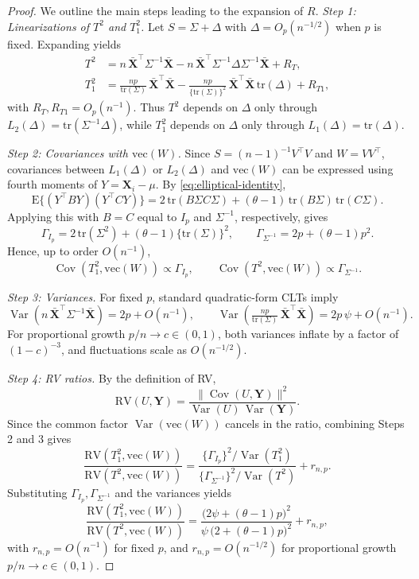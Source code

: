 \documentclass[12pt]{article}
\theoremstyle{remark}
\theoremstyle{plain}
\DeclareMathOperator{\Var}{Var}
\DeclareMathOperator{\Cov}{Cov}
\begin{document}
\begin{proof} We outline the main steps leading to the expansion of $R$.
	\textit{Step 1: Linearizations of $T^2$ and $T_1^2$.}  
	Let $S=\Sigma+\Delta$ with $\Delta=O_p(n^{-1/2})$ when $p$ is fixed. Expanding yields
	\begin{align}
		T^2 &= n\,\bar{\mathbf{X}}^{\top}\Sigma^{-1}\bar{\mathbf{X}}
		- n\,\bar{\mathbf{X}}^{\top}\Sigma^{-1}\Delta\Sigma^{-1}\bar{\mathbf{X}} + R_{T}, \label{eq:T2-exp}\\
		T_1^2 &= \frac{n p}{\mathrm{tr}(\Sigma)}\,\bar{\mathbf{X}}^{\top}\bar{\mathbf{X}}
		- \frac{n p}{\{\mathrm{tr}(\Sigma)\}^{2}}\,\bar{\mathbf{X}}^{\top}\bar{\mathbf{X}}\,\mathrm{tr}(\Delta) + R_{T1}, \label{eq:T1-exp}
	\end{align}
	with $R_T,R_{T1}=O_p(n^{-1})$. Thus $T^2$ depends on $\Delta$ only through $L_2(\Delta)=\mathrm{tr}(\Sigma^{-1}\Delta)$, while $T_1^2$ depends on $\Delta$ only through $L_1(\Delta)=\mathrm{tr}(\Delta)$.
	
	\textit{Step 2: Covariances with $\mathrm{vec}(W)$.}  
	Since $S=(n-1)^{-1}V^\top V$ and $W=VV^\top$, covariances between $L_1(\Delta)$ or $L_2(\Delta)$ and $\mathrm{vec}(W)$ can be expressed using fourth moments of $Y=\mathbf{X}_i-\mu$. 
	By \eqref{eq:elliptical-identity},
	\[
	\mathrm{E}\{(Y^\top BY)(Y^\top CY)\}
	=2\,\mathrm{tr}(B\Sigma C\Sigma)+(\theta-1)\,\mathrm{tr}(B\Sigma)\,\mathrm{tr}(C\Sigma).
	\]
	Applying this with $B=C$ equal to $I_p$ and $\Sigma^{-1}$, respectively, gives
	\[
	\Gamma_{I_p} = 2\,\mathrm{tr}(\Sigma^2) + (\theta-1)\{\mathrm{tr}(\Sigma)\}^2, 
	\qquad
	\Gamma_{\Sigma^{-1}} = 2p+(\theta-1)p^2.
	\]
	Hence, up to order $O(n^{-1})$, 
	\[
	\Cov(T_1^2,\mathrm{vec}(W)) \propto \Gamma_{I_p}, 
	\qquad 
	\Cov(T^2,\mathrm{vec}(W)) \propto \Gamma_{\Sigma^{-1}}.
	\]
	
	\textit{Step 3: Variances.}  
	For fixed $p$, standard quadratic-form CLTs imply
	\[
	\Var\!\left(n\,\bar{\mathbf{X}}^{\top}\Sigma^{-1}\bar{\mathbf{X}}\right) = 2p+O(n^{-1}),
	\qquad
	\Var\!\left(\tfrac{n p}{\mathrm{tr}(\Sigma)}\,\bar{\mathbf{X}}^{\top}\bar{\mathbf{X}}\right) 
	= 2p\,\psi+O(n^{-1}).
	\]
	For proportional growth $p/n\to c\in(0,1)$, both variances inflate by a factor of $(1-c)^{-3}$, and fluctuations scale as $O(n^{-1/2})$.
	
	\textit{Step 4: RV ratios.}  
	By the definition of RV,
	\[
	\mathrm{RV}(U,\mathbf{Y})=\frac{\|\Cov(U,\mathbf{Y})\|^2}{\Var(U)\,\Var(\mathbf{Y})}.
	\]
	Since the common factor $\Var(\mathrm{vec}(W))$ cancels in the ratio, combining Steps 2 and 3 gives
	\[
	\frac{\mathrm{RV}(T_1^2,\mathrm{vec}(W))}{\mathrm{RV}(T^2,\mathrm{vec}(W))}
	=\frac{\{\Gamma_{I_p}\}^2/\Var(T_1^2)}{\{\Gamma_{\Sigma^{-1}}\}^2/\Var(T^2)}+r_{n,p}.
	\]
	Substituting $\Gamma_{I_p},\Gamma_{\Sigma^{-1}}$ and the variances yields
	\[
	\frac{\mathrm{RV}(T_1^2,\mathrm{vec}(W))}{\mathrm{RV}(T^2,\mathrm{vec}(W))}
	=\frac{\big(2\psi+(\theta-1)p\big)^2}{\psi\,\big(2+(\theta-1)p\big)^2}+r_{n,p},
	\]
	with $r_{n,p}=O(n^{-1})$ for fixed $p$, and $r_{n,p}=O(n^{-1/2})$ for proportional growth $p/n\to c\in(0,1)$.
	

\end{proof}
\end{document}
